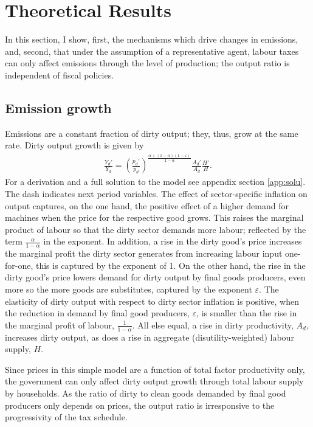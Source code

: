 \section{Theoretical Results}\label{sec:theory}

In this section, I show, first, the mechanisms which drive changes in emissions, and, second, that under the assumption of a representative agent, labour taxes can only affect emissions through the level of production; the output ratio is independent of fiscal policies. 


\subsection{Emission growth}
Emissions are a constant fraction of dirty output; they, thus, grow at the same rate.
Dirty output growth is given by
\begin{align*}
	\frac{Y_d'}{Y_d}=\left(\frac{p_d'}{p_d}\right)^{\frac{\alpha+(1-\alpha)(1-\varepsilon)}{1-\alpha}}\frac{A_d'}{A_d}\frac{H'}{H}.
\end{align*}
For a derivation and a full solution to the model see appendix section \ref{app:solu}. The dash indicates next period variables.
The effect of sector-specific inflation on output captures, on the one hand, the positive effect of a higher demand for machines when the price for the respective good grows. This raises the marginal product of labour so that the dirty sector demands more labour; reflected by the term $\frac{\alpha}{1-\alpha}$ in the exponent. In addition,  a rise in the dirty good's price increases the marginal profit the dirty sector generates from increasing labour input one-for-one, this is captured by the exponent of 1. On the other hand,  the rise in the dirty good's price lowers demand for dirty output by final goods producers, even more so the more goods are substitutes, captured by the exponent $\varepsilon$. The elasticity of dirty output with respect to dirty sector inflation is positive, when the reduction in demand by final good producers, $\varepsilon$,  is smaller than the rise in the marginal profit of labour, $\frac{1}{1-\alpha}$. 
All else equal, a rise in dirty productivity, $A_d$, increases dirty output, as does a rise in aggregate (disutility-weighted) labour supply, $H$.

Since prices in this simple model are a function of total factor productivity only, the government can only affect dirty output growth through total labour supply by households. As the ratio of dirty to clean goods demanded by final good producers only depends on prices, the output ratio is irresponsive to the progressivity of the tax schedule.%


